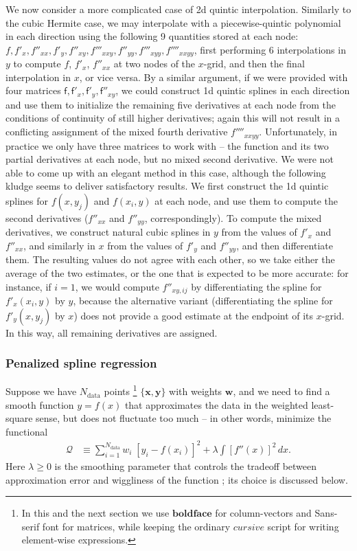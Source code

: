 \documentclass[12pt]{article}
\newcommand{\bx}{\boldsymbol{x}}
\newcommand{\by}{\boldsymbol{y}}
\begin{document}
We now consider a more complicated case of 2d quintic interpolation. Similarly to the cubic Hermite case, we may interpolate with a piecewise-quintic polynomial in each direction using the following 9 quantities stored at each node: $f, f'_x, f''_{xx}, f'_y, f''_{xy}, f'''_{xxy}, f''_{yy}, f'''_{xyy}, f''''_{xxyy}$, first performing 6 interpolations in $y$ to compute $f$, $f'_x$, $f''_{xx}$ at two nodes of the $x$-grid, and then the final interpolation in $x$, or vice versa.
By a similar argument, if we were provided with four matrices $\mathsf{f}, \mathsf{f}'_x, \mathsf{f}'_y, \mathsf{f}''_{xy}$, we could construct 1d quintic splines in each direction and use them to initialize the remaining five derivatives at each node from the conditions of continuity of still higher derivatives; again this will not result in a conflicting assignment of the mixed fourth derivative $f''''_{xxyy}$. Unfortunately, in practice we only have three matrices to work with -- the function and its two partial derivatives at each node, but no mixed second derivative. We were not able to come up with an elegant method in this case, although the following kludge seems to deliver satisfactory results. We first construct the 1d quintic splines for $f(x, y_j)$ and $f(x_i, y)$ at each node, and use them to compute the second derivatives ($f''_{xx}$ and $f''_{yy}$, correspondingly). To compute the mixed derivatives, we construct natural cubic splines in $y$ from the values of $f'_x$ and $f''_{xx}$, and similarly in $x$ from the values of $f'_y$ and $f''_{yy}$, and then differentiate them. The resulting values do not agree with each other, so we take either the average of the two estimates, or the one that is expected to be more accurate: for instance, if $i=1$, we would compute $f''_{xy,ij}$ by differentiating the spline for $f'_x(x_i,y)$ by $y$, because the alternative variant (differentiating the spline for $f'_y(x,y_j)$ by $x$) does not provide a good estimate at the endpoint of its $x$-grid. In this way, all remaining derivatives are assigned.

\subsubsection{Penalized spline regression}  \label{sec:MathSplineApproxDetails}

Suppose we have $N_\mathrm{data}$ points%
\footnote{In this and the next section we use $\boldsymbol{boldface}$ for column-vectors and \textsf{Sans-serif} font for matrices, while keeping the ordinary $cursive$ script for writing element-wise expressions.}%
$\{\bx, \by\}$ with weights $\boldsymbol{w}$, and we need to find a smooth function $y=f(x)$ that approximates the data in the weighted least-square sense, but does not fluctuate too much -- in other words, minimize the functional
\begin{align}  \label{eq:ObjectiveSplineFit}
\mathcal{Q} &\equiv \sum_{i=1}^{N_\mathrm{data}} w_i\;\left[y_i - f(x_i)\right]^2 + \lambda \int \left[f''(x)\right]^2 \,dx .
\end{align}
Here $\lambda\ge 0$ is the smoothing parameter that controls the tradeoff between approximation error and wiggliness of the function \cite{GreenSilverman}; its choice is discussed below.
\end{document}
